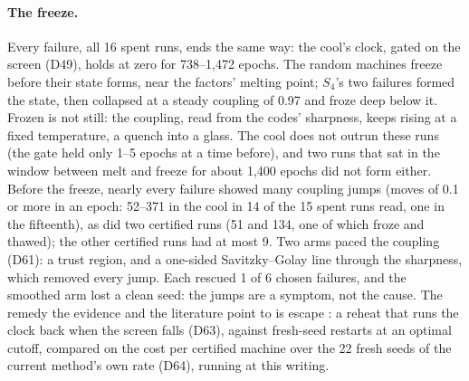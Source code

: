 \documentclass[11pt]{article}
\begin{document}
\paragraph{The freeze.} Every failure, all 16 spent runs, ends the same way: the cool's clock, gated
on the screen (D49), holds at zero for 738--1,472 epochs. The random machines freeze before their
state forms, near the factors' melting point; $S_4$'s two failures formed the state, then collapsed at
a steady coupling of 0.97 and froze deep below it. Frozen is not still: the coupling, read from the
codes' sharpness, keeps rising at a fixed temperature, a quench into a glass. The cool does not outrun
these runs (the gate held only 1--5 epochs at a time before), and two runs that sat in the window
between melt and freeze for about 1,400 epochs did not form either. Before the freeze, nearly every
failure showed many coupling jumps (moves of 0.1 or more in an epoch: 52--371 in the cool in 14 of the
15 spent runs read, one in the fifteenth), as did two certified runs (51 and 134, one of which froze
and thawed); the other certified runs had at most 9. Two arms paced the coupling (D61): a trust region, and a one-sided Savitzky--Golay
line through the sharpness, which removed every jump. Each rescued 1 of 6 chosen failures, and the
smoothed arm lost a clean seed: the jumps are a symptom, not the cause. The remedy the evidence and
the literature point to is escape \citep{luby-1993-optimal-speedup-las-vegas-algorithms}: a reheat that runs the
clock back when the screen falls (D63), against fresh-seed restarts at an optimal cutoff, compared on
the cost per certified machine over the 22 fresh seeds of the current method's own rate (D64),
running at this writing.
\end{document}
